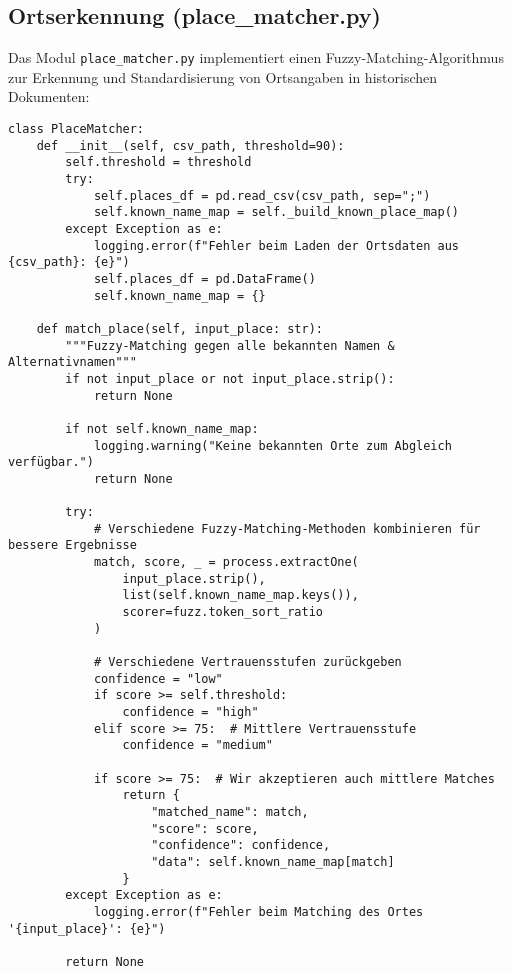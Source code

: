 \documentclass{article}
\begin{document}
\subsection{Ortserkennung (place\_matcher.py)}
Das Modul \texttt{place\_matcher.py} implementiert einen Fuzzy-Matching-Algorithmus zur Erkennung und Standardisierung von Ortsangaben in historischen Dokumenten:

\begin{tcolorbox}[title=Ortserkennung mit Fuzzy-Matching]
\begin{lstlisting}[style=pythonstyle]
class PlaceMatcher:
    def __init__(self, csv_path, threshold=90):
        self.threshold = threshold
        try:
            self.places_df = pd.read_csv(csv_path, sep=";")
            self.known_name_map = self._build_known_place_map()
        except Exception as e:
            logging.error(f"Fehler beim Laden der Ortsdaten aus {csv_path}: {e}")
            self.places_df = pd.DataFrame()
            self.known_name_map = {}

    def match_place(self, input_place: str):
        """Fuzzy-Matching gegen alle bekannten Namen & Alternativnamen"""
        if not input_place or not input_place.strip():
            return None
            
        if not self.known_name_map:
            logging.warning("Keine bekannten Orte zum Abgleich verfügbar.")
            return None
            
        try:
            # Verschiedene Fuzzy-Matching-Methoden kombinieren für bessere Ergebnisse
            match, score, _ = process.extractOne(
                input_place.strip(), 
                list(self.known_name_map.keys()), 
                scorer=fuzz.token_sort_ratio
            )
            
            # Verschiedene Vertrauensstufen zurückgeben
            confidence = "low"
            if score >= self.threshold:
                confidence = "high"
            elif score >= 75:  # Mittlere Vertrauensstufe
                confidence = "medium"
                
            if score >= 75:  # Wir akzeptieren auch mittlere Matches
                return {
                    "matched_name": match,
                    "score": score,
                    "confidence": confidence,
                    "data": self.known_name_map[match]
                }
        except Exception as e:
            logging.error(f"Fehler beim Matching des Ortes '{input_place}': {e}")
        
        return None
\end{lstlisting}
\end{tcolorbox}
\end{document}
